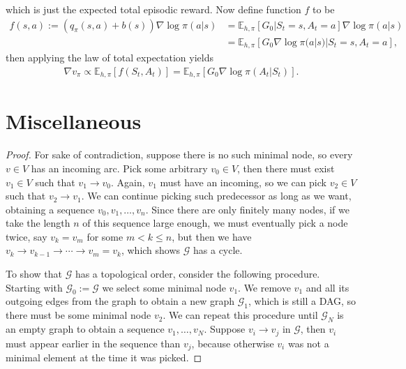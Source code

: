 \documentclass[a4paper]{report}
\theoremstyle{definition}
\theoremstyle{plain}
\begin{document}
which is just the expected total episodic reward.
%
Now define function $f$ to be
\begin{subequations}
\begin{align}
  f(s, a) := (q_{\pi}(s, a) + b(s))\nabla \log \pi(a | s) &= \mathbb{E}_{h,\pi} \left[ G_{0} | S_{t} = s, A_{t} = a \right] \nabla \log \pi(a | s) \\
  &= \mathbb{E}_{h,\pi} \left[ G_{0} \nabla \log \pi(a | s) | S_{t} = s, A_{t} = a \right] ,
\end{align}
\end{subequations}
then applying the law of total expectation yields
\begin{align}
  \nabla v_{\pi} \propto \mathbb{E}_{h,\pi}[f(S_{t}, A_{t})] =  \mathbb{E}_{h, \pi} \left[ G_{0} \nabla \log \pi(A_{t} | S_{t}) \right] .
\end{align}



\chapter{Miscellaneous}\label{app:misc}

\minimalnode*
\begin{proof}
  For sake of contradiction, suppose there is no such minimal node, so every
  $v \in V$ has an incoming arc. Pick some arbitrary $v_0 \in V$, then there
  must exist $v_1 \in V$ such that $v_1 \rightarrow v_0$. Again, $v_1$ must have
  an incoming, so we can pick $v_2 \in V$ such that $v_2 \rightarrow v_1$. We
  can continue picking such predecessor as long as we want, obtaining a sequence
  $v_0, v_1, \dots, v_n$. Since there are only finitely many nodes, if we take
  the length $n$ of this sequence large enough, we must eventually pick a node
  twice, say $v_k = v_m$ for some $m < k \leq n$, but then we have
  $v_k \rightarrow v_{k-1} \rightarrow \cdots \rightarrow v_m = v_k$, which
  shows $\mathcal{G}$ has a cycle.

  To show that $\mathcal{G}$ has a topological order, consider the following
  procedure. Starting with $\mathcal{G}_0 := \mathcal{G}$ we select some minimal
  node $v_1$. We remove $v_1$ and all its outgoing edges from the graph to
  obtain a new graph $\mathcal{G}_1$, which is still a DAG, so there must be
  some minimal node $v_2$. We can repeat this procedure until
  $\mathcal{G}_{N}$ is an empty graph to obtain a sequence $v_1, \dots, v_N$.
  Suppose $v_i \rightarrow v_j$ in $\mathcal{G}$, then $v_i$ must appear earlier
  in the sequence than $v_j$, because otherwise $v_i$ was not a minimal element
  at the time it was picked.
\end{proof}
\end{document}
